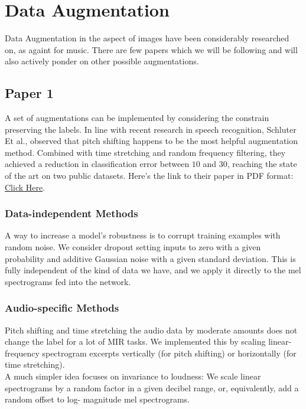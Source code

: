 \chapter{Data Augmentation}

Data Augmentation in the aspect of images have been considerably researched on, as againt for music. There are few papers which we will be following and will also actively ponder on other possible augmentations.  \\ 

\section{Paper 1}
A set of augmentations can be implemented by considering the constrain preserving the labels.
In line with recent research in speech recognition, Schluter Et al., observed that pitch shifting happens to be the most helpful augmentation method. Combined with time stretching and random frequency filtering, they achieved a reduction in classification error between $10$ and $30$, reaching the state of the art on two public datasets. 
Here's the link to their paper in PDF format: \href{http://ofai.at/\~jan.schlueter/pubs/2015_ismir.pdf}{Click Here}. \\ 

\subsection{Data-independent Methods}

A way to increase a model’s robustness is to corrupt training examples with random noise. We consider dropout setting inputs to zero with a given probability and additive Gaussian noise with a given standard deviation. This is fully independent of the kind of data we have, and we apply it directly to the mel spectrograms fed into the network.


\subsection{Audio-specific Methods}
Pitch shifting and time stretching the audio data by moderate amounts does not change the label for a lot of MIR tasks. We implemented this by scaling linear-frequency spectrogram excerpts vertically (for pitch shifting) or horizontally (for time stretching).  \\ 

A much simpler idea focuses on invariance to loudness: We scale linear spectrograms by a random factor in a given decibel range, or, equivalently, add a random offset to log- magnitude mel spectrograms.  \\ 

